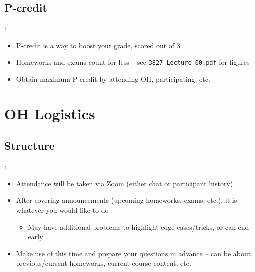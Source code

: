 \documentclass{../slides}
\begin{document}
\subsection{P-credit}
\begin{frame}{\secname: \subsecname}
    \begin{itemize}
        \item P-credit is a way to boost your grade, scored out of $3$
        \item Homeworks and exams count for less -- see \lstinline{3827_Lecture_00.pdf} for figures
        \item Obtain maximum P-credit by attending OH, participating, etc.
    \end{itemize}
\end{frame}

\section{OH Logistics}
\subsection{Structure}
\begin{frame}{\secname: \subsecname}
    \begin{itemize}
        \item Attendance will be taken via Zoom (either chat or participant history)
        \item After covering announcements (upcoming homeworks, exams, etc.), it is whatever you would like to do
        \begin{itemize}
            \item May have additional problems to highlight edge cases/tricks, or can end early
        \end{itemize}
        \item Make use of this time and prepare your questions in advance -- can be about previous/current homeworks, current course content, etc.
    \end{itemize}
\end{frame}
\end{document}
